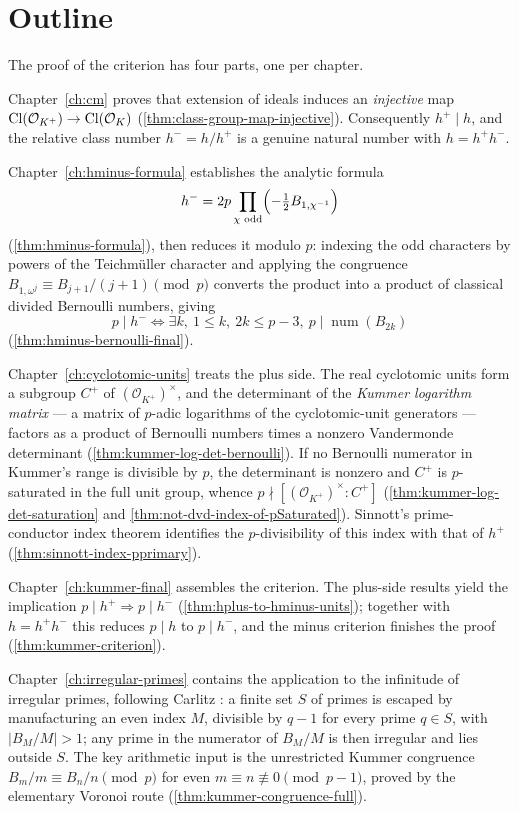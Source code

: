 \section{Outline}

The proof of the criterion has four parts, one per chapter.

Chapter~\ref{ch:cm} proves that extension of ideals induces an
\emph{injective} map $\mathrm{Cl}(\mathcal O_{K^+}) \to \mathrm{Cl}(\mathcal O_K)$
(\cref{thm:class-group-map-injective}).  Consequently $h^+ \mid h$, and the
relative class number $h^- = h/h^+$ is a genuine natural number with
$h = h^+ h^-$.

Chapter~\ref{ch:hminus-formula} establishes the analytic formula
\[
  h^- = 2p \prod_{\chi \text{ odd}} \Bigl(-\tfrac12 B_{1,\chi^{-1}}\Bigr)
\]
(\cref{thm:hminus-formula}), then reduces it modulo $p$: indexing the odd
characters by powers of the Teichm\"uller character and applying the
congruence $B_{1,\omega^j} \equiv B_{j+1}/(j+1) \pmod p$ converts the
product into a product of classical divided Bernoulli numbers, giving
\[
  p \mid h^- \iff
  \exists k,\ 1 \le k,\ 2k \le p-3,\ p \mid \operatorname{num}(B_{2k})
\]
(\cref{thm:hminus-bernoulli-final}).

Chapter~\ref{ch:cyclotomic-units} treats the plus side.  The real
cyclotomic units form a subgroup $C^+$ of $(\mathcal O_{K^+})^\times$, and
the determinant of the \emph{Kummer logarithm matrix} --- a matrix of
$p$-adic logarithms of the cyclotomic-unit generators --- factors as a
product of Bernoulli numbers times a nonzero Vandermonde determinant
(\cref{thm:kummer-log-det-bernoulli}).  If no Bernoulli numerator in
Kummer's range is divisible by $p$, the determinant is nonzero and $C^+$ is
$p$-saturated in the full unit group, whence
$p \nmid [(\mathcal O_{K^+})^\times : C^+]$
(\cref{thm:kummer-log-det-saturation} and
\cref{thm:not-dvd-index-of-pSaturated}).
Sinnott's prime-conductor index theorem \cite{sinnott1978} identifies the
$p$-divisibility of this index with that of $h^+$
(\cref{thm:sinnott-index-pprimary}).

Chapter~\ref{ch:kummer-final} assembles the criterion.  The plus-side
results yield the implication $p \mid h^+ \Rightarrow p \mid h^-$
(\cref{thm:hplus-to-hminus-units}); together with $h = h^+h^-$ this reduces
$p \mid h$ to $p \mid h^-$, and the minus criterion finishes the proof
(\cref{thm:kummer-criterion}).

Chapter~\ref{ch:irregular-primes} contains the application to the
infinitude of irregular primes, following Carlitz \cite{carlitz1954}: a
finite set $S$ of primes is escaped by manufacturing an even index $M$,
divisible by $q - 1$ for every prime $q \in S$, with $|B_M/M| > 1$; any
prime in the numerator of $B_M/M$ is then irregular and lies outside $S$.
The key arithmetic input is the unrestricted Kummer congruence
$B_m/m \equiv B_n/n \pmod p$ for even $m \equiv n \not\equiv 0
\pmod{p-1}$, proved by the elementary Voronoi route
(\cref{thm:kummer-congruence-full}).

